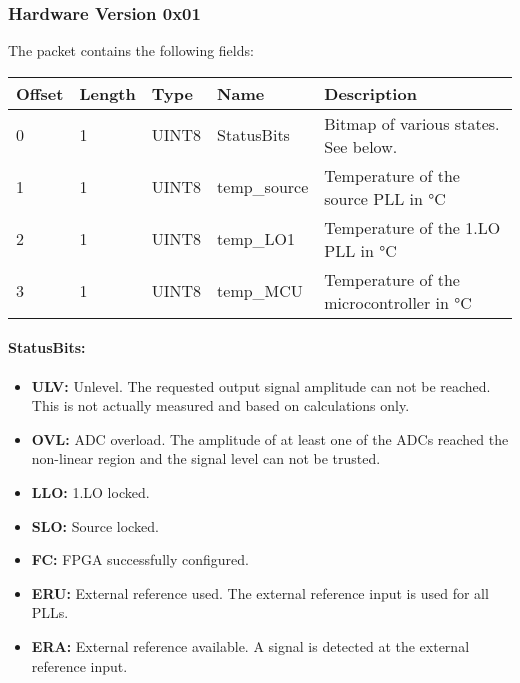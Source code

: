 \documentclass[a4paper,11pt]{article}
\newcommand{\bitrect}[2]{
  \begin{pgfonlayer}{foreground}
    \draw [thick] (0,0) rectangle (#1,1);
    \pgfmathsetmacro\result{#1-1}
    \foreach \x in {1,...,\result}
      \draw [thick] (\x,1) -- (\x, 0.8);
  \end{pgfonlayer}
  \bitlabels{#1}{#2}
}
\newcommand{\rwbits}[3]{
  \draw [thick] (#1,0) rectangle ++(#2,1) node[pos=0.5]{#3};
  \pgfmathsetmacro\start{#1+0.5}
  \pgfmathsetmacro\finish{#1+#2-0.5}
}
\newcommand{\robits}[3]{
  \begin{pgfonlayer}{background}
    \draw [thick, fill=lightgray] (#1,0) rectangle ++(#2,1) node[pos=0.5]{#3};
  \end{pgfonlayer}
  \pgfmathsetmacro\start{#1+0.5}
  \pgfmathsetmacro\finish{#1+#2-0.5}
}
\newcommand{\bitlabels}[2]{
  \foreach \bit in {1,...,#1}{
     \pgfmathsetmacro\result{#2}
     \node [above] at (\bit-0.5, 1) {\pgfmathprintnumber{\result}};
   }
}
\begin{document}
\subsubsection{Hardware Version 0x01}
The packet contains the following fields:
\begin{ThreePartTable}
\setlength\tabcolsep{3pt}

\begin{longtable}{p{} |  p{}  |  p{}| p{} | p{}}
\toprule
\textbf{Offset} &\textbf{Length} &\textbf{Type} & \textbf{Name} &\textbf{Description} \\ 
\hline
\endhead
\midrule[\heavyrulewidth]
\endfoot  
\midrule[\heavyrulewidth]
\endlastfoot

0 & 1 & UINT8 & StatusBits & Bitmap of various states. See below.\\
1 & 1 & UINT8 & temp\_source & Temperature of the source PLL in \si{\celsius} \\
2 & 1 & UINT8 & temp\_LO1 & Temperature of the 1.LO PLL in \si{\celsius} \\
3 & 1 & UINT8 & temp\_MCU & Temperature of the microcontroller in \si{\celsius} \\
\end{longtable}   
\end{ThreePartTable}

\paragraph{StatusBits:}
\begin{center}
\end{center}
\begin{itemize}
\item \textbf{ULV:} Unlevel. The requested output signal amplitude can not be reached. This is not actually measured and based on calculations only.
\item \textbf{OVL:} ADC overload. The amplitude of at least one of the ADCs reached the non-linear region and the signal level can not be trusted.
\item \textbf{LLO:} 1.LO locked.
\item \textbf{SLO:} Source locked.
\item \textbf{FC:} FPGA successfully configured.
\item \textbf{ERU:} External reference used. The external reference input is used for all PLLs.
\item \textbf{ERA:} External reference available. A signal is detected at the external reference input.
\end{itemize}
\end{document}
